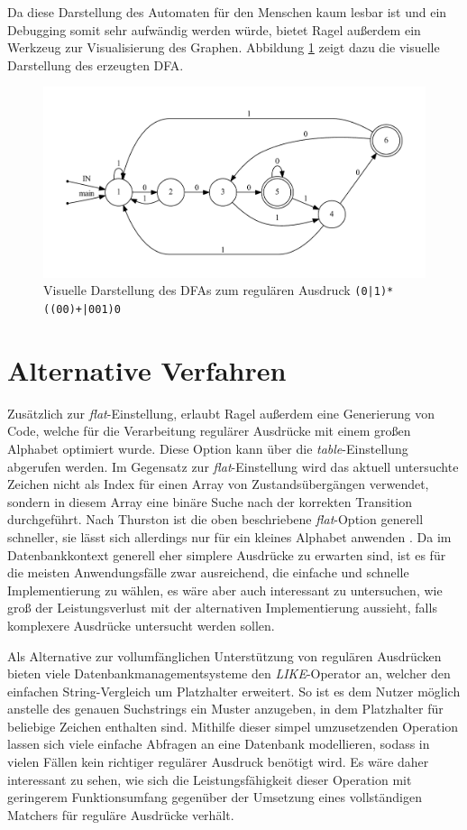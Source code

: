 Da diese Darstellung des Automaten für den Menschen kaum lesbar ist und ein Debugging somit sehr aufwändig werden würde, bietet Ragel außerdem ein Werkzeug zur Visualisierung des Graphen.
Abbildung \ref{ragel_visualisierung} zeigt dazu die visuelle Darstellung des erzeugten DFA.

\begin{figure}[ht]
	\includegraphics[width=\textwidth]{bilder/ragel_visualisierung.pdf}
	\caption{Visuelle Darstellung des DFAs zum regulären Ausdruck \texttt{(0|1)*((00)+|001)0}}
	\label{ragel_visualisierung}
\end{figure}

\section{Alternative Verfahren}

Zusätzlich zur \emph{flat}-Einstellung, erlaubt Ragel außerdem eine Generierung von Code, welche für die Verarbeitung regulärer Ausdrücke mit einem großen Alphabet optimiert wurde.
Diese Option kann über die \emph{table}-Einstellung abgerufen werden.
Im Gegensatz zur \emph{flat}-Einstellung wird das aktuell untersuchte Zeichen nicht als Index für einen Array von Zustandsübergängen verwendet, sondern in diesem Array eine binäre Suche nach der korrekten Transition durchgeführt.
Nach Thurston ist die oben beschriebene \emph{flat}-Option generell schneller, sie lässt sich allerdings nur für ein kleines Alphabet anwenden \cite{Thurston2009}.
Da im Datenbankkontext generell eher simplere Ausdrücke zu erwarten sind, ist es für die meisten Anwendungsfälle zwar ausreichend, die einfache und schnelle Implementierung zu wählen, es wäre aber auch interessant zu untersuchen, wie groß der Leistungsverlust mit der alternativen Implementierung aussieht, falls komplexere Ausdrücke untersucht werden sollen.

Als Alternative zur vollumfänglichen Unterstützung von regulären Ausdrücken bieten viele Datenbankmanagementsysteme den \emph{LIKE}-Operator an, welcher den einfachen String-Vergleich um Platzhalter erweitert.
So ist es dem Nutzer möglich anstelle des genauen Suchstrings ein Muster anzugeben, in dem Platzhalter für beliebige Zeichen enthalten sind.
Mithilfe dieser simpel umzusetzenden Operation lassen sich viele einfache Abfragen an eine Datenbank modellieren, sodass in vielen Fällen kein richtiger regulärer Ausdruck benötigt wird.
Es wäre daher interessant zu sehen, wie sich die Leistungsfähigkeit dieser Operation mit geringerem Funktionsumfang gegenüber der Umsetzung eines vollständigen Matchers für reguläre Ausdrücke verhält.